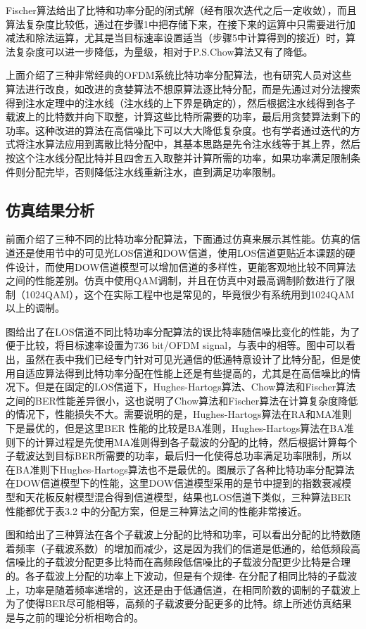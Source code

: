 Fischer算法给出了比特和功率分配的闭式解（经有限次迭代之后一定收敛），而且算法复杂度比较低，通过在步骤1中把存储下来，在接下来的运算中只需要进行加减法和除法运算，尤其是当目标速率设置适当（步骤5中计算得到的接近）时，算法复杂度可以进一步降低，为量级，相对于P.S.Chow算法又有了降低。

上面介绍了三种非常经典的OFDM系统比特功率分配算法，也有研究人员对这些算法进行改良，如改进的贪婪算法不想原算法逐比特分配，而是先通过对分法搜索得到注水定理中的注水线（注水线的上下界是确定的\cite{余官定2005ofdm}），然后根据注水线得到各子载波上的比特数并向下取整，计算这些比特所需要的功率，最后用贪婪算法剩下的功率。这种改进的算法在高信噪比下可以大大降低复杂度。也有学者通过迭代的方式将注水算法应用到离散比特分配中，其基本思路是先令注水线等于其上界，然后按这个注水线分配比特并且四舍五入取整并计算所需的功率，如果功率满足限制条件则分配完毕，否则降低注水线重新注水，直到满足功率限制。

\subsection{仿真结果分析}

前面介绍了三种不同的比特功率分配算法，下面通过仿真来展示其性能。仿真的信道还是使用节中的可见光LOS信道和DOW信道，使用LOS信道更贴近本课题的硬件设计，而使用DOW信道模型可以增加信道的多样性，更能客观地比较不同算法之间的性能差别。仿真中使用QAM调制，并且在仿真中对最高调制阶数进行了限制（1024QAM），这个在实际工程中也是常见的，毕竟很少有系统用到1024QAM以上的调制。

图给出了在LOS信道不同比特功率分配算法的误比特率随信噪比变化的性能，为了便于比较，将目标速率设置为736 bit/OFDM signal，与表中的相等。图中可以看出，虽然在表中我们已经专门针对可见光通信的低通特意设计了比特分配，但是使用自适应算法得到比特功率分配在性能上还是有些提高的，尤其是在高信噪比的情况下。但是在固定的LOS信道下，Hughes-Hartogs算法、Chow算法和Fischer算法之间的BER性能差异很小，这也说明了Chow算法和Fischer算法在计算复杂度降低的情况下，性能损失不大。需要说明的是，Hughes-Hartogs算法在RA和MA准则下是最优的，但是这里BER 性能的比较是BA准则，Hughes-Hartogs算法在BA准则下的计算过程是先使用MA准则得到各子载波的分配的比特，然后根据计算每个子载波达到目标BER所需要的功率，最后归一化使得总功率满足功率限制，所以在BA准则下Hughes-Hartogs算法也不是最优的。图展示了各种比特功率分配算法在DOW信道模型下的性能，这里DOW信道模型采用的是节中提到的指数衰减模型和天花板反射模型混合得到信道模型，结果也LOS信道下类似，三种算法BER性能都优于表3.2 中的分配方案，但是三种算法之间的性能非常接近。

图和给出了三种算法在各个子载波上分配的比特和功率，可以看出分配的比特数随着频率（子载波系数）的增加而减少，这是因为我们的信道是低通的，给低频段高信噪比的子载波分配更多比特而在高频段低信噪比的子载波分配更少比特是合理的。各子载波上分配的功率上下波动，但是有个规律- 在分配了相同比特的子载波上，功率是随着频率递增的，这还是由于低通信道，在相同阶数的调制的子载波上为了使得BER尽可能相等，高频的子载波要分配更多的比特。综上所述仿真结果是与之前的理论分析相吻合的。


